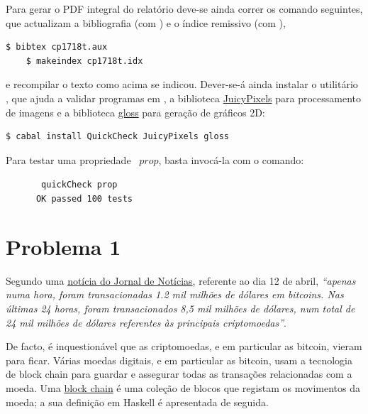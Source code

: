 \documentclass[a4paper]{article}
\newcommand{\Conid}[1]{\mathit{#1}}
\newcommand{\Varid}[1]{\mathit{#1}}
\def\resethooks{%
  \global\let\SaveRestoreHook\empty
  \global\let\ColumnHook\empty}
\let\hspre\empty
\let\hspost\empty
\begin{document}
Para gerar o PDF integral do relatório deve-se ainda correr os comando seguintes,
que actualizam a bibliografia (com \Bibtex) e o índice remissivo (com \Makeindex),
\begin{Verbatim}[fontsize=\small]
    $ bibtex cp1718t.aux
    $ makeindex cp1718t.idx
\end{Verbatim}
e recompilar o texto como acima se indicou. Dever-se-á ainda instalar o utilitário
\QuickCheck,
que ajuda a validar programas em \Haskell, a biblioteca
\href{https://hackage.haskell.org/package/JuicyPixels}{JuicyPixels} para processamento
de imagens e a biblioteca \href{http://gloss.ouroborus.net/}{gloss} para geração de gráficos 2D:
\begin{Verbatim}[fontsize=\small]
    $ cabal install QuickCheck JuicyPixels gloss
\end{Verbatim}
Para testar uma propriedade \QuickCheck~\ensuremath{\Varid{prop}}, basta invocá-la com o comando:
\begin{tabbing}\tt
~~~~~~quickCheck~prop\\
\tt ~~~~~~OK~passed~100~tests
\end{tabbing}

\section*{Problema 1}

Segundo uma \href{https://www.jn.pt/economia/interior/compra-diaria-de-bitcoins-iguala-acoes-da-apple-9257302.html}{notícia do Jornal de Notícias},
referente ao dia 12 de abril, \emph{``apenas numa hora, foram transacionadas 1.2 mil milhões de dólares em bitcoins. Nas últimas 24 horas, foram transacionados 8,5 mil milhões de dólares, num total de 24 mil milhões de dólares referentes às principais criptomoedas''}.

De facto, é inquestionável que as criptomoedas, e em particular as bitcoin, vieram para ficar.
%
Várias moedas digitais, e em particular as bitcoin, usam a tecnologia de block chain
para guardar e assegurar todas as transações relacionadas com a moeda.
%
Uma \href{https://en.bitcoin.it/wiki/Block_chain}{block chain} é uma coleção de blocos que registam os movimentos da moeda; a sua definição em Haskell é apresentada de seguida.

\resethooks
\end{document}
